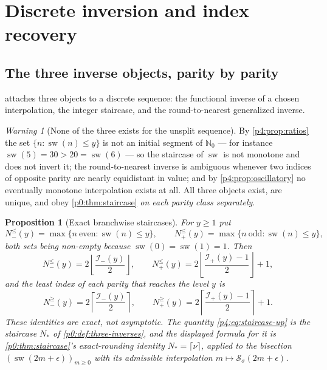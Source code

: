 \documentclass[11pt,a4paper,oneside]{book}
\theoremstyle{plain}
\newtheorem{proposition}[theorem]{Proposition}
\theoremstyle{definition}
\theoremstyle{remark}
\newtheorem{warning}[theorem]{Warning}
\newcommand{\Nat}{\mathbb{N}}
\begin{document}
\section{Discrete inversion and index recovery}
\label{p4:sec:discrete}

\subsection{The three inverse objects, parity by parity}

 attaches three objects to a discrete sequence:
the functional inverse of a chosen interpolation, the integer staircase, and
the round-to-nearest generalized inverse.

\begin{warning}[None of the three exists for the unsplit sequence]
\label{p4:rem:no-global}
By \cref{p4:prop:ratios} the set $\{n:\operatorname{sw}(n)\le y\}$ is not an
initial segment of $\Nat_0$ --- for instance
$\operatorname{sw}(5)=30>20=\operatorname{sw}(6)$ --- so the staircase of
$\operatorname{sw}$ is not monotone and does not invert it; the
round-to-nearest inverse is ambiguous whenever two indices of opposite parity
are nearly equidistant in value; and by \cref{p4:prop:oscillatory} no
eventually monotone interpolation exists at all.  All three objects exist, are
unique, and obey \cref{p0:thm:staircase} \emph{on each parity class
separately}.
\end{warning}

\begin{proposition}[Exact branchwise staircases]
\label{p4:prop:staircase}
For $y\ge1$ put
\begin{equation}
  N^{\le}_-(y)=\max\{n\ \text{even}:\operatorname{sw}(n)\le y\},
  \qquad
  N^{\le}_+(y)=\max\{n\ \text{odd}:\operatorname{sw}(n)\le y\},
  \label{p4:eq:Nle-def}
\end{equation}
both sets being non-empty because $\operatorname{sw}(0)=\operatorname{sw}(1)=1$.
Then
\begin{equation}
  \boxed{\;
  N^{\le}_-(y)=2\left\lfloor\frac{\mathcal I_-(y)}{2}\right\rfloor,
  \qquad
  N^{\le}_+(y)=2\left\lfloor\frac{\mathcal I_+(y)-1}{2}\right\rfloor+1,\;}
  \label{p4:eq:staircase}
\end{equation}
and the least index of each parity that reaches the level $y$ is
\begin{equation}
  N^{\ge}_-(y)=2\left\lceil\frac{\mathcal I_-(y)}{2}\right\rceil,
  \qquad
  N^{\ge}_+(y)=2\left\lceil\frac{\mathcal I_+(y)-1}{2}\right\rceil+1 .
  \label{p4:eq:staircase-up}
\end{equation}
These identities are \emph{exact}, not asymptotic.  The quantity
\cref{p4:eq:staircase-up} is the staircase $N_\ast$ of
\cref{p0:def:three-inverses}, and the displayed formula for it is
\cref{p0:thm:staircase}'s exact-rounding identity
$N_\ast=\lceil\nu\rceil$, applied to the bisection
$(\operatorname{sw}(2m+\epsilon))_{m\ge0}$ with its admissible interpolation
$m\mapsto\mathcal S_\sigma(2m+\epsilon)$.
\end{proposition}
\end{document}
